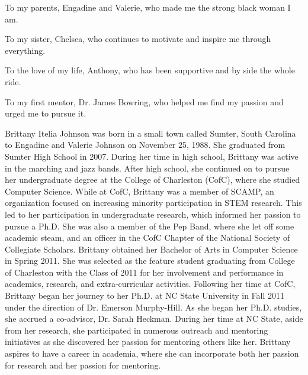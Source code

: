 \makecopyrightpage

\maketitlepage

\begin{dedication}
\doublespacing
 \centering To my parents, Engadine and Valerie, who made me the strong black woman I am.
 
 \centering To my sister, Chelsea, who continues to motivate and inspire me through everything.
 
 \centering To the love of my life, Anthony, who has been supportive and by side the whole ride.
 
 \centering To my first mentor, Dr. James Bowring, who helped me find my passion and urged me to pursue it.
\end{dedication}

\begin{biography}
\doublespacing
Brittany Itelia Johnson was born in a small town called Sumter, South Carolina to Engadine and Valerie Johnson on November 25, 1988. She graduated from Sumter High School in 2007. During her time in high school, Brittany was active in the marching and jazz bands. After high school, she continued on to pursue her undergraduate degree at the College of Charleston (CofC), where she studied Computer Science. 
While at CofC, Brittany was a member of SCAMP, an organization focused on increasing minority participation in STEM research. This led to her participation in undergraduate research, which informed her passion to pursue a Ph.D. She was also a member of the Pep Band, where she let off some academic steam, and an officer in the CofC Chapter of the National Society of Collegiate Scholars.
Brittany obtained her Bachelor of Arts in Computer Science in Spring 2011. She was selected as the feature student graduating from College of Charleston with the Class of 2011 for her involvement and performance in academics, research, and extra-curricular activities. 
Following her time at CofC, Brittany began her journey to her Ph.D. at NC State University in Fall 2011 under the direction of Dr. Emerson Murphy-Hill. As she began her Ph.D. studies, she accrued a co-advisor, Dr. Sarah Heckman. During her time at NC State, aside from her research, she participated in numerous outreach and mentoring initiatives as she discovered her passion for mentoring others like her.  
Brittany aspires to have a career in academia, where she can incorporate both her passion for research and her passion for mentoring.
\end{biography}

